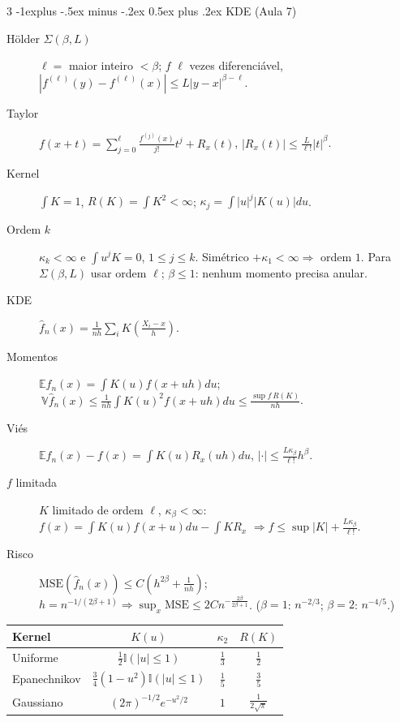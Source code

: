 \documentclass[10pt,landscape]{article}
\makeatletter
\newcommand{\E}{\mathbb{E}}
\newcommand{\V}{\mathbb{V}}
\newcommand{\I}{\mathbb{I}}
\newcommand{\MSE}{\textrm{MSE}}
\renewcommand{\subsection}{\@startsection{subsection}{2}{0mm}%
                                {-1explus -.5ex minus -.2ex}%
                                {0.5ex plus .2ex}%
                                {\normalfont\footnotesize\bfseries}}
\makeatother
\begin{document}
\begin{multicols}{3}
\subsection{KDE (Aula 7)}
\begin{description}
  \item[Hölder $\Sigma(\beta,L)$] $\ell=$ maior inteiro $<\beta$; $f$ $\ell$ vezes diferenciável, $|f^{(\ell)}(y)-f^{(\ell)}(x)|\le L|y-x|^{\beta-\ell}$.
  \item[Taylor] $f(x+t)=\sum_{j=0}^{\ell}\frac{f^{(j)}(x)}{j!}t^j+R_x(t)$, $|R_x(t)|\le\frac L{\ell!}|t|^\beta$.
  \item[Kernel] $\int K=1$, $R(K)=\int K^2<\infty$; $\kappa_j=\int|u|^j|K(u)|du$.
  \item[Ordem $k$] $\kappa_k<\infty$ e $\int u^jK=0$, $1\le j\le k$. Simétrico $+\kappa_1<\infty\Rightarrow$ ordem $1$. Para $\Sigma(\beta,L)$ usar ordem $\ell$; $\beta\le1$: nenhum momento precisa anular.
  \item[KDE] $\hat f_n(x)=\frac1{nh}\sum_iK\!\left(\frac{X_i-x}h\right)$.
  \item[Momentos] $\E\hat f_n(x)=\int K(u)f(x+uh)du$; $\ \V\hat f_n(x)\le\frac1{nh}\int K(u)^2f(x+uh)du\le\frac{\sup f\,R(K)}{nh}$.
  \item[Viés] $\E\hat f_n(x)-f(x)=\int K(u)R_x(uh)du$, $|\cdot|\le\frac{L\kappa_\beta}{\ell!}h^\beta$.
  \item[$f$ limitada] $K$ limitado de ordem $\ell$, $\kappa_\beta<\infty$: $f(x)=\int K(u)f(x+u)du-\int KR_x$ $\Rightarrow f\le\sup|K|+\frac{L\kappa_\beta}{\ell!}$.
  \item[Risco] $\MSE(\hat f_n(x))\le C\left(h^{2\beta}+\frac1{nh}\right)$; $h=n^{-1/(2\beta+1)}\Rightarrow\sup_x\MSE\le2Cn^{-\frac{2\beta}{2\beta+1}}$. ($\beta=1$: $n^{-2/3}$; $\beta=2$: $n^{-4/5}$.)
\end{description}
\begin{center}
\begin{tabular}{lccc}
\toprule
Kernel & $K(u)$ & $\kappa_2$ & $R(K)$ \\
\midrule
Uniforme & $\frac12\I(|u|\le1)$ & $\frac13$ & $\frac12$ \\
Epanechnikov & $\frac34(1-u^2)\I(|u|\le1)$ & $\frac15$ & $\frac35$ \\
Gaussiano & $(2\pi)^{-1/2}e^{-u^2/2}$ & $1$ & $\frac1{2\sqrt\pi}$ \\
\bottomrule
\end{tabular}
\end{center}


\end{multicols}
\end{document}
